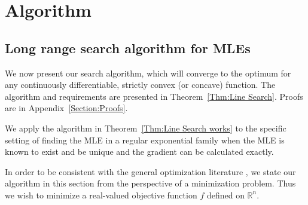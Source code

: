 \documentclass[oneside]{myumnStatThesis}
\def\RR{{\mathbb R}}
\begin{document}
\chapter{Algorithm}
\section{Long range search algorithm for MLEs} \label{Section:Algorithm}
We now present our search algorithm, which will converge to the optimum for any continuously differentiable, strictly 
convex (or concave) function.  The algorithm and requirements are presented in Theorem~\ref{Thm:Line Search}.  Proofs 
are in Appendix~\ref{Section:Proofs}. 


We apply the algorithm in Theorem~\ref{Thm:Line Search works} to the specific setting of finding the MLE in a regular 
exponential family when the MLE is known to exist and be unique and the gradient can be calculated exactly.

In order to be consistent with the general optimization literature \citep{Fletcher,NW}, we state our algorithm in this 
section from the perspective of a minimization problem.  Thus we wish to minimize a real-valued objective function $f$ 
defined on $\RR^n$.  
\end{document}
